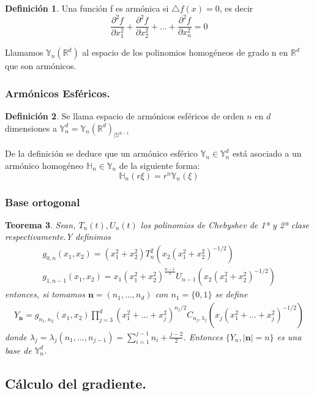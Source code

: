 \documentclass{beamer}
\theoremstyle{plain}
\newtheorem{thm}{Teorema}
\theoremstyle{definition}
\newtheorem{defn}[thm]{Definici\'{o}n}
\theoremstyle{plain}
\theoremstyle{definition}
\theoremstyle{remark}
\theoremstyle{definition}
\begin{document}
\begin{frame}
	\begin{defn}
		Una función f es armónica si $\triangle f (x) = 0$, es decir $$\frac{\partial^2 f}{\partial x_1^2}+\frac{\partial^2 f}{\partial x_2^2}+...+\frac{\partial^2 f}{\partial x_n^2} = 0$$
	\end{defn}

	Llamamos $\mathds{Y}_n(\mathds{R}^d)$ al espacio de los polinomios homogéneos de grado n en $\mathds{R}^d$ que son armónicos.

\end{frame}
\begin{frame}
	\frametitle{Armónicos Esféricos.}
	\begin{defn}
		Se llama espacio de armónicos esféricos de orden $n$ en $d$ dimensiones a	$\mathds{Y}^d_n = \mathds{Y}_n(\mathds{R}^d)_{|\mathds{S}^{d-1}}$ 
	\end{defn}
	De la definición se deduce que un armónico esférico $\mathds{Y}_n \in \mathds{Y}^d_n$ está asociado a un armónico homogéneo $\mathds{H}_n \in \mathds{Y}_n$ de la siguiente forma:
	$$
	\mathds{H}_n(r\xi) = r^n\mathds{Y}_n(\xi)
	$$
\end{frame}
\begin{frame}
	\frametitle{Base ortogonal}
	\begin{thm}
		Sean, $T_{n}(t),U_{n}(t)$ los polinomios de Chebyshev de 1ª y 2ª clase respectivamente.Y definimos
		\begin{gather*}
		g_{0,n}(x_1,x_2) = (x_1^2+x_2^2)T_n^2(x_2(x_1^2+x_2^2)^{-1/2})
		\\
		g_{1,n-1}(x_1,x_2) = x_1(x_1^2+x_2^2)^{\frac{n-1}{2}}U_{n-1}(x_2(x_1^2+x_2^2)^{-1/2})
		\end{gather*}
		entonces, si tomamos $\textbf{n}=(n_1,...,n_d)$ con $n_1 = \{0,1\}$ se define
		\begin{gather*}
		Y_{\textbf{n}}=g_{n_1,n_2}(x_1,x_2)\prod_{j=3}^{d}(x_1^2+...+x_j^2)^{n_j/2}C_{n_j,\lambda_j}(x_j(x_1^2+...+x_j^2)^{-1/2})
		\end{gather*}
		donde $\lambda_j =\lambda_j(n_1,...,n_{j-1}) = \sum_{i=1}^{j-1}n_i + \frac{j-2}{2}$. Entonces $\{Y_n,|\textbf{n}|=n\}$ es una base de $\mathds{Y}_{n}^{d}$.
	\end{thm}
\end{frame}
\subsection{Cálculo del gradiente.}
\begin{frame}
	\tableofcontents[currentsection,currentsubsection,sections=1]
\end{frame}
\end{document}

